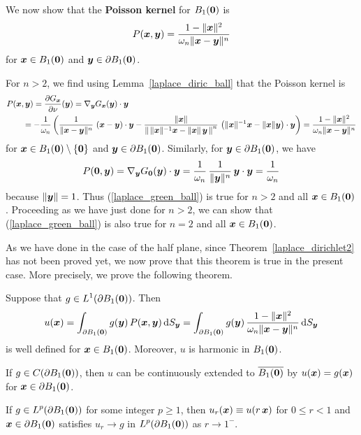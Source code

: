We now show that the {\bfseries Poisson kernel}
for $B_1({\bm{0}})$ is
\begin{equation} \label{laplace_green_ball}
P({\bm{x}},{\bm{y}}) =
\frac{1-\|{\bm{x}}\|^2}{\omega_n \|{\bm{x}}-{\bm{y}}\|^n}
\end{equation}
for ${\bm{x}}\in B_1({\bm{0}})$ and ${\bm{y}} \in \partial B_1({\bm{0}})$.

For $n>2$, we find using Lemma~\ref{laplace_diric_ball} that the
Poisson kernel is
\begin{align*}
& P({\bm{x}},{\bm{y}}) = \frac{\partial{G_{{\bm{x}}}}}{\partial \nu}({\bm{y}}) =
\nabla_{{\bm{y}}} G_{{\bm{x}}}({\bm{y}}) \cdot {\bm{y}} \\
&\qquad
= - \frac{1}{\omega_n} \left( \frac{1}{\| {\bm{x}} - {\bm{y}}\|^{n}}
\, \left({\bm{x}}-{\bm{y}}\right) \cdot {\bm{y}} -
\frac{\|{\bm{x}}\|}
{\left\| \, \|{\bm{x}}\|^{-1}{\bm{x}} - \|{\bm{x}}\|\,{\bm{y}}\, \right\|^{n}}
\, \left( \|{\bm{x}}\|^{-1}{\bm{x}} - \|{\bm{x}}\|{\bm{y}}
\right) \cdot {\bm{y}} \right)
= \frac{1-\|{\bm{x}}\|^2}{\omega_n \|{\bm{x}}-{\bm{y}}\|^n}
\end{align*}
for ${\bm{x}} \in B_1({\bm{0}})\setminus \{{\bm{0}}\}$ and
${\bm{y}} \in \partial B_1({\bm{0}})$.  Similarly, for
${\bm{y}} \in \partial B_1({\bm{0}})$, we have
\[
P({\bm{0}},{\bm{y}}) = \nabla_{{\bm{y}}} G_{{\bm{0}}}({\bm{y}}) \cdot {\bm{y}}
= \frac{1}{\omega_n} \, \frac{1}{\|{\bm{y}}\|^{n}}
\, {\bm{y}} \cdot {\bm{y}} = \frac{1}{\omega_n}
\]
because $\|{\bm{y}}\|=1$.
Thus (\ref{laplace_green_ball}) is true for $n>2$ and all
${\bm{x}} \in B_1({\bm{0}})$.  Proceeding as we have just done for
$n>2$, we can show that (\ref{laplace_green_ball}) is also true for
$n=2$ and all ${\bm{x}} \in B_1({\bm{0}})$.

As we have done in the case of the half plane, since
Theorem~\ref{laplace_dirichlet2} has not been proved yet, we now prove
that this theorem is true in the present case.  More precisely, we
prove the following theorem.

\begin{theorem} \label{laplace_exist_ball}
Suppose that $\displaystyle g \in L^1(\partial B_1({\bm{0}}))$.  Then
\[
u({\bm{x}}) = \int_{\partial B_1({\bm{0}})} g({\bm{y}}) \,
P({\bm{x}},{\bm{y}}) \,\mathrm{d}{S}_{{\bm{y}}}
= \int_{\partial B_1({\bm{0}})} g({\bm{y}}) \,
\frac{1-\|{\bm{x}}\|^2}{\omega_n \|{\bm{x}}-{\bm{y}}\|^n} \,\mathrm{d}{S}_{{\bm{y}}}
\]
is well defined for ${\bm{x}} \in B_1({\bm{0}})$.
Moreover, $u$ is harmonic in $B_1({\bm{0}})$.

If $g\in C(\partial B_1({\bm{0}}))$, then $u$ can be
continuously extended to $\overline{B_1({\bm{0}})}$ by
$u({\bm{x}}) = g({\bm{x}})$ for ${\bm{x}} \in \partial B_1({\bm{0}})$.

If $\displaystyle g \in L^p(\partial B_1({\bm{0}}))$ for some integer
$p \geq 1$, then $u_r({\bm{x}}) \equiv u(r\,{\bm{x}})$ for $0\leq r < 1$ and
${\bm{x}} \in \partial B_1({\bm{0}})$ satisfies $u_r \rightarrow g$ in
$\displaystyle L^p(\partial B_1({\bm{0}}))$ as $r \rightarrow 1^-$.
\end{theorem}

